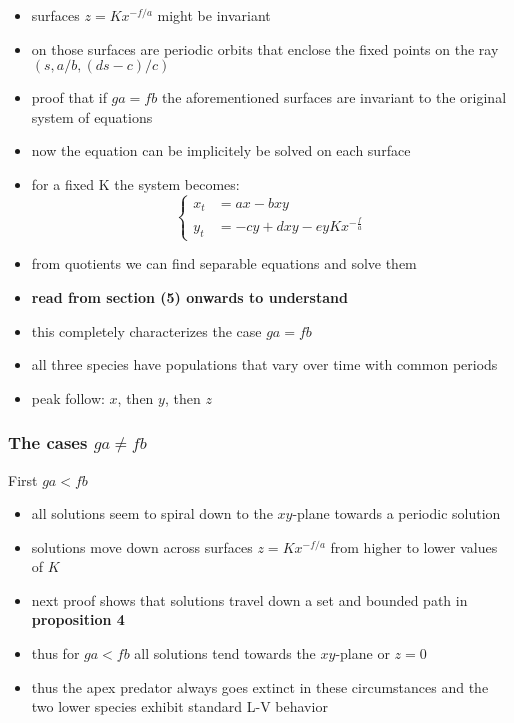 \documentclass[a4paper,reqno,11pt]{article}
\begin{document}
\begin{itemize}
    \item surfaces $z = Kx^{-f/a}$ might be invariant
    \item on those surfaces are periodic orbits that enclose the fixed points
        on the ray $(s,a/b,(ds-c)/c)$
    \item proof that if $ga=fb$  the aforementioned surfaces are invariant to
        the original system of equations
    \item now the equation can be implicitely be solved on each surface
    \item for a fixed K the system becomes:
        \begin{equation}
            \left\{\begin{aligned}
                x_t &= ax - bxy \\
                y_t &= -cy + dxy - eyKx^{-\frac{f}{a}}
            \end{aligned}\right.
        \end{equation}
    \item from quotients we can find separable equations and solve them
    \item \textbf{read from section (5) onwards to understand}
    \item this completely characterizes the case $ga=fb$ 
    \item all three species have populations that vary over time with common
        periods
    \item peak follow: $x$, then $y$, then $z$
\end{itemize}

\subsubsection{The cases $ga \neq fb$}

First $ga < fb$

\begin{itemize}
    \item all solutions seem to spiral down to the $xy$-plane
        towards a periodic solution
    \item solutions move down across surfaces $z = Kx^{-f/a}$ from higher to
        lower values of $K$
    \item next proof shows that solutions travel down a set and bounded path in
        \textbf{proposition 4}
    \item thus for $ga < fb$ all solutions tend towards the $xy$-plane or $z=0$
    \item thus the apex predator always goes extinct in these circumstances and
        the two lower species exhibit standard L-V behavior
\end{itemize}
\end{document}
